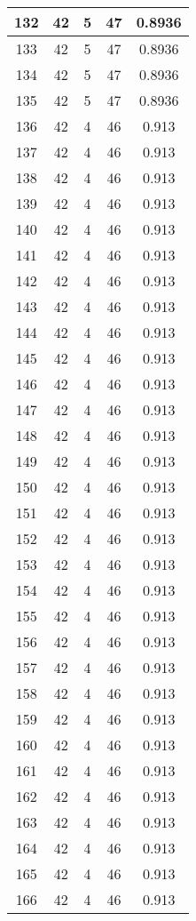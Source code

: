 \documentclass[letterpaper, 12pt]{article}
\begin{document}
\begin{longtable}{|c|c|c|c|c|}
\hline
132 & 42 & 5 & 47 & 0.8936 \\
\hline
133 & 42 & 5 & 47 & 0.8936 \\
\hline
134 & 42 & 5 & 47 & 0.8936 \\
\hline
135 & 42 & 5 & 47 & 0.8936 \\
\hline
136 & 42 & 4 & 46 & 0.913 \\
\hline
137 & 42 & 4 & 46 & 0.913 \\
\hline
138 & 42 & 4 & 46 & 0.913 \\
\hline
139 & 42 & 4 & 46 & 0.913 \\
\hline
140 & 42 & 4 & 46 & 0.913 \\
\hline
141 & 42 & 4 & 46 & 0.913 \\
\hline
142 & 42 & 4 & 46 & 0.913 \\
\hline
143 & 42 & 4 & 46 & 0.913 \\
\hline
144 & 42 & 4 & 46 & 0.913 \\
\hline
145 & 42 & 4 & 46 & 0.913 \\
\hline
146 & 42 & 4 & 46 & 0.913 \\
\hline
147 & 42 & 4 & 46 & 0.913 \\
\hline
148 & 42 & 4 & 46 & 0.913 \\
\hline
149 & 42 & 4 & 46 & 0.913 \\
\hline
150 & 42 & 4 & 46 & 0.913 \\
\hline
151 & 42 & 4 & 46 & 0.913 \\
\hline
152 & 42 & 4 & 46 & 0.913 \\
\hline
153 & 42 & 4 & 46 & 0.913 \\
\hline
154 & 42 & 4 & 46 & 0.913 \\
\hline
155 & 42 & 4 & 46 & 0.913 \\
\hline
156 & 42 & 4 & 46 & 0.913 \\
\hline
157 & 42 & 4 & 46 & 0.913 \\
\hline
158 & 42 & 4 & 46 & 0.913 \\
\hline
159 & 42 & 4 & 46 & 0.913 \\
\hline
160 & 42 & 4 & 46 & 0.913 \\
\hline
161 & 42 & 4 & 46 & 0.913 \\
\hline
162 & 42 & 4 & 46 & 0.913 \\
\hline
163 & 42 & 4 & 46 & 0.913 \\
\hline
164 & 42 & 4 & 46 & 0.913 \\
\hline
165 & 42 & 4 & 46 & 0.913 \\
\hline
166 & 42 & 4 & 46 & 0.913 \\

\end{longtable}
\end{document}
